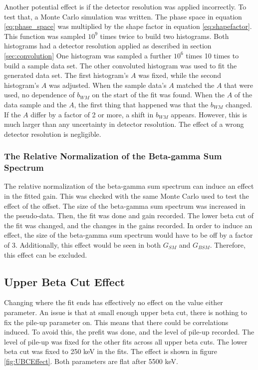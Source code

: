\documentclass[../MaxHughesThesis.tex]{subfiles}
\begin{document}
Another potential effect is if the detector resolution was applied incorrectly.
To test that, a Monte Carlo simulation was written.
The phase space in equation \ref{eq:phase_space} was multiplied by the shape factor in equation \ref{eq:shapefactor}.
This function was sampled $10^{9}$ times twice to build two histograms. 
Both histograms had a detector resolution applied as described in section \ref{sec:convolution}
One histogram was sampled a further $10^{6}$ times 10 times to build a sample data set.
The other convoluted histogram was used to fit the generated data set.
The first histogram's $A$ was fixed, while the second histogram's $A$ was adjusted.
When the sample data's $A$ matched the $A$ that were used, no dependence of $b_{WM}$ on the start of the fit was found.
When the $A$ of the data sample and the $A$, the first thing that happened was that the $b_{WM}$ changed.
If the $A$ differ by a factor of 2 or more, a shift in $b_{WM}$ appears.
However, this is much larger than any uncertainty in detector resolution.
The effect of a wrong detector resolution is negligible. 

\subsubsection{The Relative Normalization of the Beta-gamma Sum Spectrum}

The relative normalization of the beta-gamma sum spectrum can induce an effect in the fitted gain.
This was checked with the same Monte Carlo used to test the effect of the offset.
The size of the beta-gamma sum spectrum was increased in the pseudo-data.
Then, the fit was done and gain recorded.
The lower beta cut of the fit was changed, and the changes in the gains recorded.
In order to induce an effect, the size of the beta-gamma sum spectrum would have to be off by a factor of 3.
Additionally, this effect would be seen in both $G_{SM}$ and $G_{BSM}$. 
Therefore, this effect can be excluded. 

\subsection{Upper Beta Cut Effect}

Changing where the fit ends has effectively no effect on the value either parameter.
An issue is that at small enough upper beta cut, there is nothing to fix the pile-up parameter on. 
This means that there could be correlations induced.
To avoid this, the  prefit was done, and the level of pile-up recorded.
The level of pile-up was fixed for the other fits across all upper beta cuts.
The lower beta cut was fixed to 250 keV in the fits. 
The effect is shown in figure \ref{fig:UBCEffect}.
Both parameters are flat after 5500 keV.
\end{document}
